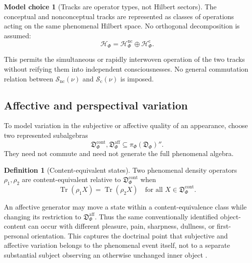 \documentclass[11pt,reqno]{scrartcl}
\newcommand{\scrHF}{\mathscr H_{\Phi}}
\newcommand{\piF}{\pi_{\Phi}}
\DeclareMathOperator{\Tr}{Tr}
\newcommand{\detAlg}{\mathfrak D_{\Phi}}
\newcommand{\vas}{\nu}
\newcommand{\contentAlg}{\mathfrak D_{\Phi}^{\mathrm{cont}}}
\newcommand{\affectAlg}{\mathfrak D_{\Phi}^{\mathrm{aff}}}
\theoremstyle{plain}
\theoremstyle{definition}
\newtheorem{definition}[definition]{Definition}
\newtheorem{modelchoice}[modelchoice]{Model choice}
\theoremstyle{remark}
\begin{document}
\begin{modelchoice}[Tracks are operator types, not Hilbert sectors]
\label{choice:tracks-not-sectors}
The conceptual and nonconceptual tracks are represented as classes of
operations acting on the same phenomenal Hilbert space.  No orthogonal
decomposition is assumed:
\begin{equation}
  \scrHF
  =\scrHF^{\mathrm{nc}}\oplus\scrHF^{\mathrm{c}}.
  \label{eq:rejected-conceptual-sector-split}
\end{equation}
\end{modelchoice}

This permits the simultaneous or rapidly interwoven operation of the two
tracks without reifying them into independent consciousnesses.  No general
commutation relation between
$\mathcal S_{\mathrm{nc}}(\vas)$ and
$\mathcal S_{\mathrm{c}}(\vas)$ is imposed.

\subsection{Affective and perspectival variation}

To model variation in the subjective or affective quality of an appearance,
choose two represented subalgebras
\begin{equation}
  \contentAlg,\affectAlg\subseteq\piF(\detAlg)''.
  \label{eq:content-affect-subalgebras}
\end{equation}
They need not commute and need not generate the full phenomenal algebra.

\begin{definition}[Content-equivalent states]
\label{def:content-equivalent-states}
Two phenomenal density operators $\rho_1,\rho_2$ are content-equivalent relative
to $\contentAlg$ when
\begin{equation}
  \Tr(\rho_1 X)=\Tr(\rho_2 X)
  \quad
  \text{for all }X\in\contentAlg.
  \label{eq:content-equivalence}
\end{equation}
\end{definition}

An affective generator may move a state within a content-equivalence class
while changing its restriction to $\affectAlg$.  Thus the same conventionally
identified object-content can occur with different pleasure, pain, sharpness,
dullness, or first-personal orientation.  This captures the doctrinal point
that subjective and affective variation belongs to the phenomenal event
itself, not to a separate substantial subject observing an otherwise
unchanged inner object \cite[pp.~414--456]{Yiannopoulos2020}.
\end{document}
